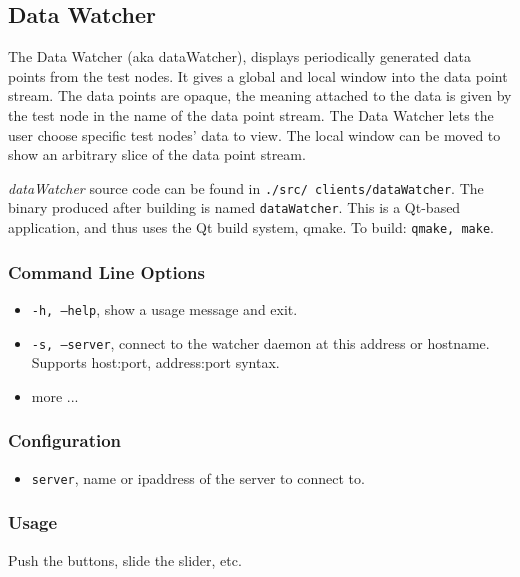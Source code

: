 \subsection{Data Watcher}
\label{DataWatcher}

The Data Watcher (aka dataWatcher), displays periodically generated data points from the test nodes. It gives a global and local window
into the data point stream. The data points are opaque, the meaning attached to the data is given by the test node in the name of the data point stream.
The Data Watcher lets the user choose specific test nodes' data to view. The local window can be moved to show an arbitrary slice of the data point
stream.

{\it dataWatcher} source code can be found in {\tt .\slash src\slash
clients\slash dataWatcher}. The binary produced after building is 
named {\tt dataWatcher}. This is a Qt-based application, and thus uses the Qt build system, qmake. To build: {\tt qmake, make}.

\subsubsection{Command Line Options}
\begin{itemize}
\item {\tt -h, --help}, show a usage message and exit. 
\item {\tt -s, --server}, connect to the watcher daemon at this address or hostname. Supports host:port, address:port syntax.
\item more ...
\end{itemize}

\subsubsection{Configuration}
\begin{itemize}
\item {\tt server}, name or ipaddress of the server to connect to.
\end{itemize}

\subsubsection{Usage}

Push the buttons, slide the slider, etc.



